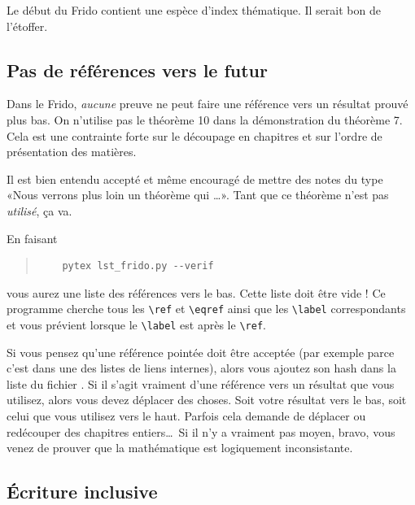 Le début du Frido contient une espèce d'index thématique. Il serait bon de l'étoffer.

\subsection{Pas de références vers le futur}

Dans le Frido, \emph{aucune} preuve ne peut faire une référence vers un résultat prouvé plus bas. On n'utilise pas le théorème 10 dans la démonstration du théorème 7. Cela est une contrainte forte sur le découpage en chapitres et sur l'ordre de présentation des matières.

Il est bien entendu accepté et même encouragé de mettre des notes du type «Nous verrons plus loin un théorème qui \ldots». Tant que ce théorème n'est pas \emph{utilisé}, ça va.

En faisant
\begin{quote}
    \begin{verbatim}
    pytex lst_frido.py --verif
    \end{verbatim}
\end{quote}
vous aurez une liste des références vers le bas. Cette liste doit être vide ! Ce programme cherche tous les \verb+\ref+ et \verb+\eqref+ ainsi que les \verb+\label+ correspondants et vous prévient lorsque le \verb+\label+ est après le \verb+\ref+.

Si vous pensez qu'une référence pointée doit être acceptée (par exemple parce c'est dans une des listes de liens internes), alors vous ajoutez son hash dans la liste du fichier . Si il s'agit vraiment d'une référence vers un résultat que vous utilisez, alors vous devez déplacer des choses. Soit votre résultat vers le bas, soit celui que vous utilisez vers le haut. Parfois cela demande de déplacer ou redécouper des chapitres entiers\ldots\ Si il n'y a vraiment pas moyen, bravo, vous venez de prouver que la mathématique est logiquement inconsistante.

\subsection{Écriture inclusive}

